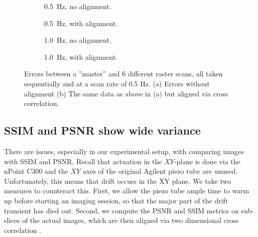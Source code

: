 \documentclass[11pt]{article}
\begin{document}
\begin{figure}
  \begin{subfigure}{.48\textwidth}
    
    \caption{0.5~Hz, no alignment.}
    \label{fig:rast_unaligned}
  \end{subfigure}
  \hfill
  \begin{subfigure}{.48\textwidth}
    
      \caption{0.5~Hz, with alignment.}
    \label{fig:baseline_errors_aligned}
  \end{subfigure}
    \begin{subfigure}{.48\textwidth}
    
    \caption{1.0~Hz, no alignment.}
    \label{fig:rast_unaligned}
  \end{subfigure}
  \hfill
  \begin{subfigure}{.48\textwidth}
    
      \caption{1.0~Hz, with alignment.}
    \label{fig:baseline_errors_aligned}
  \end{subfigure}
% 
  \caption{Errors between a ''master'' and 6 different raster scans, all taken sequentially and at a scan rate of 0.5 Hz. (a) Errors without alignment (b) The same data as above in (a) but aligned via cross correlation.}
  \label{fig:baseline_errors}
\end{figure}

\subsection{SSIM and PSNR show wide variance}
There are issues, especially in our experimental setup, with comparing images with SSIM and PSNR. Recall that actuation in the $XY$-plane is done via the nPoint C300 and the $XY$ axes of the original Agilent piezo tube are unused. Unfortunately, this means that drift occurs in the XY plane. We take two measures to counteract this. First, we allow the piezo tube ample time to warm up before starting an imaging session, so that the major part of the drift transient has died out. Second, we compute the PSNR and SSIM metrics on sub-slices of the actual images, which are then aligned via two dimensional cross correlation \cite{mw_xcorr2}. 
\end{document}
